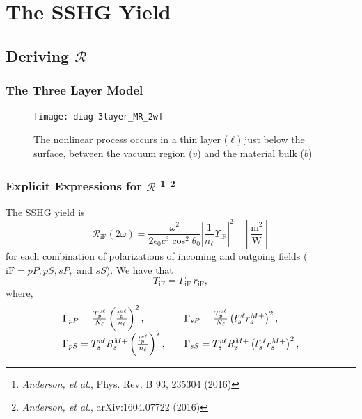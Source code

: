 \documentclass{beamer}
\begin{document}

\section{The SSHG Yield}



\subsection{Deriving \texorpdfstring{$\mathcal{R}$}{R}}

\begin{frame}
\frametitle{The Three Layer Model}
\begin{figure}
\centering
\texttt{[image: diag-3layer\_MR\_2w]}
\caption{The nonlinear process occurs in a thin layer ($\ell$) just below the
surface, between the vacuum region ($v$) and the material bulk ($b$)}
\end{figure}
\end{frame}

\begin{frame}
\frametitle{Explicit Expressions for $\mathcal{R}$%
\footnote{\emph{Anderson, et al.}, Phys. Rev. B 93, 235304 (2016)}
\footnote{\emph{Anderson, et al.}, arXiv:1604.07722 (2016)}
}
The SSHG yield is
\begin{equation*}
\mathcal{R}_{\mathrm{iF}}(2\omega) =
\frac{\omega^{2}}{2\epsilon_{0}c^3\cos^{2}\theta_{0}}
\left\vert\frac{1}{n_{\ell}}\Upsilon_{\mathrm{iF}}\right\vert^{2}
\quad\left[\frac{\mathrm{m}^{2}}{\mathrm{W}}\right]
\end{equation*}
for each combination of polarizations of incoming and outgoing fields
($\mathrm{iF} = pP, pS, sP,$ and $sS$). We have that
\begin{equation*}\label{eq:mc25}
\Upsilon_{\mathrm{iF}} = \Gamma_{\mathrm{iF}}\,r_{\mathrm{iF}},
\end{equation*}
where,
$$
\begin{array}{ l l }
\Gamma_{pP} =
\frac{T^{v\ell}_{p}}{N_{\ell}}
\left(\frac{t^{v\ell}_{p}}{n_{\ell}}\right)^{2},
&
\Gamma_{sP}=
\frac{T^{v\ell}_{p}}{N_{\ell}}
\left(t^{v\ell}_{s}r^{M+}_{s}\right)^{2},\quad\\
\Gamma_{pS} =
T_{s}^{v\ell}R^{M+}_{s}
\left(\frac{t^{v\ell}_{p}}{n_{\ell}}\right)^{2},\quad
&
\Gamma_{sS} = 
T_{s}^{v\ell}R^{M+}_{s}\left(t^{v\ell}_{s}r^{M+}_{s}\right)^{2},
\end{array}
$$
\end{frame}
\end{document}
